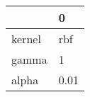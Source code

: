 \begin{tabular}{ll}
\toprule
{} &     0 \\
\midrule
kernel &   rbf \\
gamma  &     1 \\
alpha  &  0.01 \\
\bottomrule
\end{tabular}
